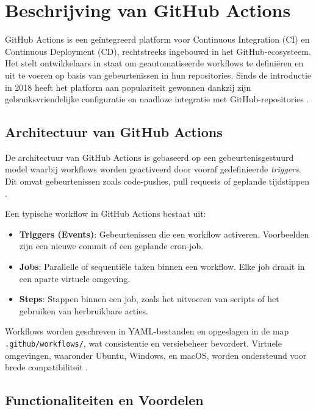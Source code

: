 \section{Beschrijving van GitHub Actions}

GitHub Actions is een geïntegreerd platform voor Continuous Integration (CI) en Continuous Deployment (CD), rechtstreeks ingebouwd in het GitHub-ecosysteem. Het stelt ontwikkelaars in staat om geautomatiseerde workflows te definiëren en uit te voeren op basis van gebeurtenissen in hun repositories. Sinds de introductie in 2018 heeft het platform aan populariteit gewonnen dankzij zijn gebruiksvriendelijke configuratie en naadloze integratie met GitHub-repositories \autocite{githubdocs2023actions}.

\subsection{Architectuur van GitHub Actions}

De architectuur van GitHub Actions is gebaseerd op een gebeurtenisgestuurd model waarbij workflows worden geactiveerd door vooraf gedefinieerde \textit{triggers}. Dit omvat gebeurtenissen zoals code-pushes, pull requests of geplande tijdstippen \autocite{githubdocs2023actions}.

Een typische workflow in GitHub Actions bestaat uit:
\begin{itemize}
    \item \textbf{Triggers (Events)}: Gebeurtenissen die een workflow activeren. Voorbeelden zijn een nieuwe commit of een geplande cron-job.
    \item \textbf{Jobs}: Parallelle of sequentiële taken binnen een workflow. Elke job draait in een aparte virtuele omgeving.
    \item \textbf{Steps}: Stappen binnen een job, zoals het uitvoeren van scripts of het gebruiken van herbruikbare acties.
\end{itemize}

Workflows worden geschreven in YAML-bestanden en opgeslagen in de map \texttt{.github/workflows/}, wat consistentie en versiebeheer bevordert. Virtuele omgevingen, waaronder Ubuntu, Windows, en macOS, worden ondersteund voor brede compatibiliteit \autocite{kulkarni2022}.

\subsection{Functionaliteiten en Voordelen}

